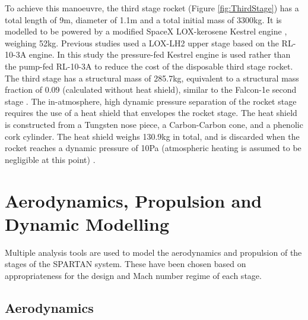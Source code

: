 \documentclass[]{aiaa-tc}
\begin{document}
To achieve this manoeuvre, the third stage rocket (Figure \ref{fig:ThirdStage}) has a total length of 9m, diameter of 1.1m and a total initial mass of 3300kg. It is modelled to be powered by a modified SpaceX LOX-kerosene Kestrel engine \cite{Vehicle2008}, weighing 52kg. Previous studies used a LOX-LH2 upper stage based on the RL-10-3A engine\cite{Preller2017}. In this study the pressure-fed Kestrel engine is used rather than the pump-fed RL-10-3A to reduce the cost of the disposable third stage rocket. The third stage has a structural mass of 285.7kg, equivalent to a structural mass fraction of 0.09 (calculated without heat shield), similar to the Falcon-1e second stage \cite{Vehicle2008}. The in-atmosphere, high dynamic pressure separation of the rocket stage requires the use of a heat shield that envelopes the rocket stage. The heat shield is constructed from a Tungsten nose piece, a Carbon-Carbon cone, and a phenolic cork cylinder. The heat shield weighs 130.9kg in total, and is discarded when the rocket reaches a dynamic pressure of 10Pa (atmospheric heating is assumed to be negligible at this point) \cite{Preller2015a,Preller2017}. 


\section{Aerodynamics, Propulsion and Dynamic Modelling}\label{section:aero}

Multiple analysis tools are used to model the aerodynamics and propulsion of the stages of the SPARTAN system. These have been chosen based on appropriateness for the design and Mach number regime of each stage. 

\subsection{Aerodynamics}
\end{document}
